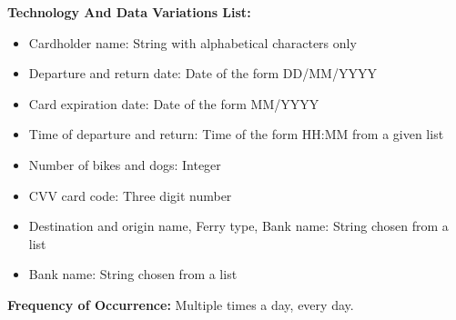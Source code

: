 \textbf{Technology And Data Variations List:} 
\begin{itemize}
    \item Cardholder name: String with alphabetical characters only
    \item Departure and return date: Date of the form DD/MM/YYYY
    \item Card expiration date: Date of the form MM/YYYY
    \item Time of departure and return: Time of the form HH:MM from a given list
    \item Number of bikes and dogs: Integer
    \item CVV card code: Three digit number
    \item Destination and origin name, Ferry type, Bank name: String chosen from a list
    \item Bank name: String chosen from a list
    \end{itemize}

\textbf{Frequency of Occurrence:} Multiple times a day, every day.


